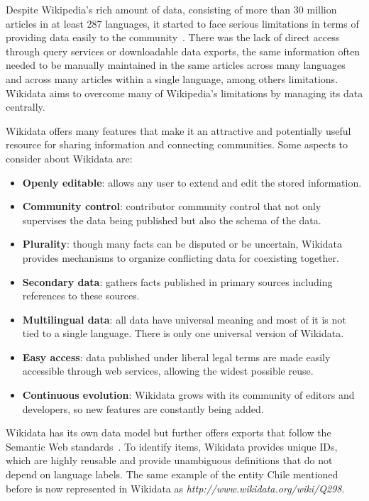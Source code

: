 Despite Wikipedia’s rich amount of data, consisting of more than 30 million articles in at least 
287 languages, it started to face serious limitations in terms of providing data easily to the 
community~\cite{KG:wikidata}. There was the lack of direct access through query services or 
downloadable data exports, the same information often needed to be manually maintained in the 
same articles across many languages and across many articles within a single language, among 
others limitations. Wikidata aims to overcome many of Wikipedia’s limitations by managing its 
data centrally.

Wikidata offers many features that make it an attractive and potentially useful resource for 
sharing information and connecting communities. Some aspects to consider about Wikidata are:

\begin{itemize}
    \item \textbf{Openly editable}: allows any user to extend and edit the stored information.
    \item \textbf{Community control}: contributor community control that not only supervises the 
    data being published but also the schema of the data. 
    \item \textbf{Plurality}: though many facts can be disputed or be uncertain, Wikidata provides 
    mechanisms to organize conflicting data for coexisting together.
    \item \textbf{Secondary data}: gathers facts published in primary sources including references 
    to these sources.
    \item \textbf{Multilingual data}: all data have universal meaning and most of it is not tied 
    to a single language. There is only one universal version of Wikidata.
    \item \textbf{Easy access}: data published under liberal legal terms are made  easily 
    accessible through web services, allowing the widest possible reuse.
    \item \textbf{Continuous evolution}: Wikidata grows with its community of editors and 
    developers, so new features are constantly being added.
\end{itemize}

Wikidata has its own data model but further offers exports that follow the Semantic Web 
standards~\cite{key:wikidataErxlebenGKMV14}. To identify items, Wikidata provides unique IDs, 
which are highly reusable and provide unambiguous definitions that do not depend on language 
labels. The same example of the entity Chile mentioned before is now represented in Wikidata as 
\textit{http://www.wikidata.org/wiki/Q298}. 

